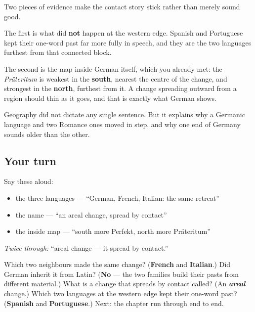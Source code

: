 \begin{culture}
Two pieces of evidence make the contact story stick rather than merely sound good.

The first is what did \textbf{not} happen at the western edge. Spanish and Portuguese kept their one-word past far more fully in speech, and they are the two languages furthest from that connected block.

The second is the map inside German itself, which you already met: the \emph{Präteritum} is weakest in the \textbf{south}, nearest the centre of the change, and strongest in the \textbf{north}, furthest from it. A change spreading outward from a region should thin as it goes, and that is exactly what German shows.

Geography did not dictate any single sentence. But it explains why a Germanic language and two Romance ones moved in step, and why one end of Germany sounds older than the other.
\end{culture}

\subsection*{Your turn}
Say these aloud:

\begin{itemize}
\raggedright
  \item the three languages — \textquotedblleft{}German, French, Italian: the same retreat\textquotedblright{}
  \item the name — \textquotedblleft{}an areal change, spread by contact\textquotedblright{}
  \item the inside map — \textquotedblleft{}south more Perfekt, north more Präteritum\textquotedblright{}
\end{itemize}

\emph{Twice through:} \textquotedblleft{}areal change — it spread by contact.\textquotedblright{}

\begin{tcolorbox}[breakable,colback=teal!4,colframe=teal!35!black,title={Before you move on}]
Which two neighbours made the same change? (\textbf{French} and \textbf{Italian}.) Did German inherit it from Latin? (\textbf{No} — the two families build their pasts from different material.) What is a change that spreads by contact called? (An \emph{\textbf{areal}} change.) Which two languages at the western edge kept their one-word past? (\textbf{Spanish} and \textbf{Portuguese}.) Next: the chapter run through end to end.
\end{tcolorbox}
